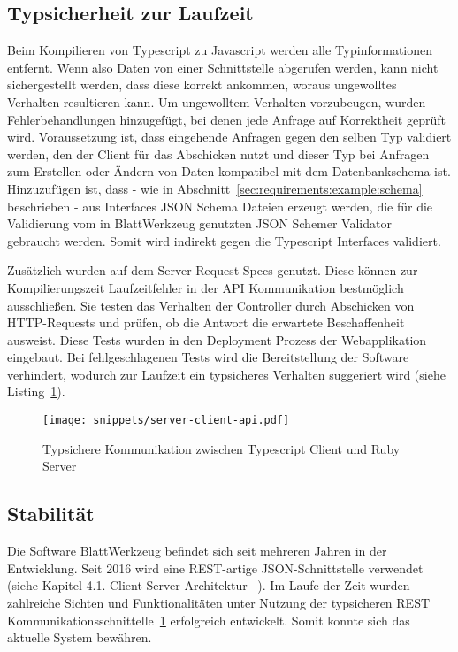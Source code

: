 \subsection{Typsicherheit zur Laufzeit}
\label{sec:requirements:pros:typesafe-runtime}
Beim Kompilieren von Typescript zu Javascript werden alle Typinformationen entfernt.
Wenn also Daten von einer Schnittstelle abgerufen werden, kann nicht sichergestellt werden, dass diese korrekt ankommen, woraus
ungewolltes Verhalten resultieren kann.
Um ungewolltem Verhalten vorzubeugen, wurden Fehlerbehandlungen hinzugefügt, bei denen jede Anfrage auf Korrektheit geprüft wird.
Voraussetzung ist, dass eingehende Anfragen gegen den selben Typ validiert werden,
den der Client für das Abschicken nutzt und dieser Typ bei Anfragen zum Erstellen oder Ändern von Daten kompatibel mit dem Datenbankschema ist.
Hinzuzufügen ist, dass - wie in Abschnitt~\ref{sec:requirements:example:schema} beschrieben - aus Interfaces JSON Schema Dateien erzeugt werden,
die für die Validierung vom in BlattWerkzeug genutzten JSON Schemer Validator~\cite{json-schemer} gebraucht werden. Somit wird indirekt gegen die Typescript Interfaces validiert.

Zusätzlich wurden auf dem Server Request Specs genutzt.
Diese können zur Kompilierungszeit Laufzeitfehler in der API Kommunikation bestmöglich ausschließen.
Sie testen das Verhalten der Controller durch Abschicken von HTTP-Requests und prüfen, ob die Antwort die erwartete Beschaffenheit ausweist. 
Diese Tests wurden in den Deployment Prozess der Webapplikation eingebaut. Bei fehlgeschlagenen Tests wird die Bereitstellung der Software
verhindert, wodurch zur Laufzeit ein typsicheres Verhalten suggeriert wird (siehe Listing~\ref{req:typesafe:server-client-short}).

\begin{figure}[h!]
    \centering
    \texttt{[image: snippets/server-client-api.pdf]}
    \caption{Typsichere Kommunikation zwischen Typescript Client und Ruby Server}
    \label{req:typesafe:server-client-short}
\end{figure}

\subsection{Stabilität}
\label{sec:requirements:pros:stable}
Die Software BlattWerkzeug befindet sich seit mehreren Jahren in der Entwicklung. Seit 2016 wird
eine REST-artige JSON-Schnittstelle verwendet (siehe Kapitel 4.1. Client-Server-Architektur ~\cite{riemer2016}).
Im Laufe der Zeit wurden zahlreiche Sichten und Funktionalitäten unter Nutzung der typsicheren REST Kommunikationsschnittelle~\ref{req:typesafe:server-client-short} erfolgreich entwickelt.
Somit konnte sich das aktuelle System bewähren.


